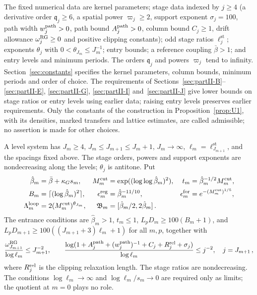 \begin{definition}\label{def:level-data}
The fixed numerical data are kernel parameters; stage data indexed by $j\ge4$ (a derivative order $\mathfrak q_j\ge6$, a spatial power $\varpi_j\ge2$, support exponent $\sigma_j=100$, path width $w_j^{\rm path}>0$, path bound $A_j^{\rm path}>0$, column bound $C_j\ge1$, drift allowance $\omega_j^{\rm RG}\ge0$ and positive clipping constants); odd stage ratios $\ell^{\mathrm{st}}_j$; exponents $\theta_j$ with $0<\theta_{J_m}\le J_m^{-1}$; entry bounds; a reference coupling $\bar\beta>1$; and entry levels and minimum periods. The orders $\mathfrak q_j$ and powers $\varpi_j$ tend to infinity. Section~\ref{sec:constants} specifies the kernel parameters, column bounds, minimum periods and order of choice. The requirements of Sections~\ref{sec:partII-B}--\ref{sec:partII-E}, \ref{sec:partII-G}, \ref{sec:partII-I} and~\ref{sec:partII-J} give lower bounds on stage ratios or entry levels using earlier data; raising entry levels preserves earlier requirements. Only the constants of the construction in Proposition~\ref{prop:U1}, with its densities, marked transfers and lattice estimates, are called admissible; no assertion is made for other choices.

A level system has $J_m\ge4$, $J_m\le J_{m+1}\le J_m+1$, $J_m\to\infty$, $\ell_m=\ell^{\mathrm{st}}_{J_{m+1}}$, and the spacings fixed above. The stage orders, powers and support exponents are nondecreasing along the levels; $\theta_j$ is antitone. Put
\begin{align}\label{eq:level-scales}
\hat\beta_m&=\bar\beta+\kappa_Gs_m,& M^{\mathrm{cut}}_m&=\exp((\log\log\hat\beta_m)^2),& t_m&=\hat\beta_m^{-1/2}M^{\mathrm{cut}}_m,\\
B_m&=\lceil(\log\hat\beta_m)^2\rceil,& \epsilon_m^{\rm reg}&=\hat\beta_m^{-11/10},& \epsilon_m^{\rm for}&=e^{-(M^{\mathrm{cut}}_m)^{1/5}},\\
\Lambda_m^{\mathrm{loop}}&=2(M^{\mathrm{cut}}_m)^{\theta_{J_m}},& \mathfrak B_m&=[\hat\beta_m/2,2\hat\beta_m]\,.
\end{align}
The entrance conditions are $\hat\beta_m>1$, $t_m\le1$, $L_pD_m\ge100(B_m+1)$, and $L_pD_{m+1}\ge100((J_{m+1}+3)\ell_m+1)$ for all $m,p$, together with
\begin{equation}\label{eq:entry-bounds}
\frac{\omega_{J_{m+1}}^{\rm RG}}{\log\ell_m}\le J_{m+1}^{-2},\qquad
\frac{\log(1+A_j^{\rm path}+(w_j^{\rm path})^{-1}+C_j+R_j^{\rm rel}+\sigma_j)}{\log\ell_m}\le j^{-2},\quad j=J_{m+1}\,,
\end{equation}
where $R_j^{\rm rel}$ is the clipping relaxation length. The stage ratios are nondecreasing. The conditions $\log\ell_m\to\infty$ and $\log\ell_m/s_m\to0$ are required only as limits; the quotient at $m=0$ plays no role.
\end{definition}

